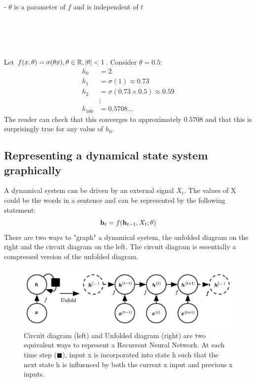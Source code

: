 - $\theta $ is a parameter of $f$ and is independent of $t$ \\ \\ \\ \\ \\

\begin{example} 
Let $f(x,\theta) = \sigma(\theta x),  \theta \in \R,  |\theta| < 1$.
Consider $\theta=0.5$:
\begin{align*}
    h_0&=2\\
    h_1 &= \sigma(1) \approx 0.73\\
    h_2 &= \sigma(0.73 \times 0.5 ) \approx 0.59\\
    &\vdots\\
    h_{100} &= 0.5708 \ldots
\end{align*}
The reader can check that this converges to approximately $0.5708$ and that this is surprisingly true for any value of $h_0$.
\end{example} 
\subsection{Representing a dynamical state system graphically} A dynamical system can be driven by an external signal $X_t$. The values of X could be the words in a sentence and can be represented by the following statement:
$$\vh_t=f(\vh_{t-1}, X_t; \theta)$$
There are two ways to "graph" a dynamical system, the unfolded diagram on the right and the circuit diagram on the left. The circuit diagram is essentially a compressed version of the unfolded diagram.

\begin{figure}[H]
    \centering
    \includegraphics[scale=0.25]{images/Chapter12/circuit_and_unfolded_diagram.png}
    \caption{Circuit diagram (left) and Unfolded diagram (right) are two equivalent ways to represent a Recurrent Neural Network. At each time step ($\blacksquare$), input x is incorporated into state h such that the next state h is influenced by both the current x input and previous x inputs.}
    \label{fig:12.1}
\end{figure}

